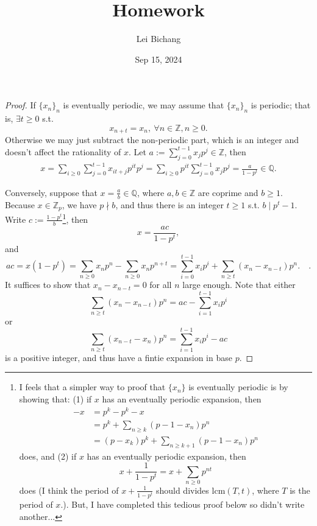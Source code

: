 \documentclass{article}
\title{Homework}
\author{Lei Bichang}
\date{Sep 15, 2024}
\theoremstyle{definition}
\theoremstyle{remark}
\newcommand{\Q}{\mathbb{Q}}
\newcommand{\Z}{\mathbb{Z}}
\begin{document}
\maketitle

\begin{proof}
If $\{x_n\}_n$ is eventually periodic, we may assume that $\{x_n\}_n$ is periodic; that is, $\exists t\ge 0$ s.t. \[x_{n + t} = x_n,\ \forall n\in\Z, n\ge 0.\]
Otherwise we may just subtract the non-periodic part, which is an integer and doesn't affect the rationality of $x$.
Let $a := \sum_{j=0}^{t-1}x_jp^j\in\Z$,
then \begin{align*}
    x = \sum_{i\ge 0}\sum_{j=0}^{t-1} x_{it+j}p^{it}p^j
    = \sum_{i\ge 0}p^{it}\sum_{j=0}^{t-1}x_jp^j 
    = \frac{a}{1-p^t}\in\Q.
\end{align*}

Conversely, suppose that $x = \frac{a}{b}\in\Q$, where $a, b\in\Z$ are coprime and $b\ge 1$.
Because $x\in\Z_p$, we have $p\nmid b$, and thus there is an integer $t\ge 1$ s.t. $b \mid p^t-1$.
Write $c := \frac{1-p^t}{b}$\footnote{I feels that a simpler way to proof that $\{x_n\}$ is eventually periodic is by showing that:
(1) if $x$ has an eventually periodic expansion, then \begin{align*}
            -x &= p^k - p^k -x\\
            &= p^k + \sum_{n\ge k}(p-1 -x_n)p^n\\
            &= (p - x_k)p^k + \sum_{n\ge k + 1}(p - 1 - x_n)p^n
        \end{align*} does,
and (2) if $x$ has an eventually periodic expansion, then
\[x + \frac{1}{1-p^t} = x + \sum_{n\ge 0}p^{nt}\] does (I think the period of $x + \frac{1}{1-p^t}$ should divides $\mathrm{lcm} (T, t)$, where $T$ is the period of $x$.). But, I have completed this tedious proof below so didn't write another...},
then \[x = \frac{ac}{1-p^t},\]
and \[ac = x(1-p^t) = \sum_{n\ge 0}x_np^n - \sum_{n\ge 0}x_{n}p^{n+t} = \sum_{i=0}^{t-1}x_ip^i + \sum_{n\ge t}(x_n-x_{n-t})p^n.\quad.\]
It suffices to show that $x_n - x_{n-t} = 0$ for all $n$ large enough.
Note that either \[\sum_{n\ge t}(x_n-x_{n-t})p^n = ac - \sum_{i=1}^{t-1}x_ip^i\] or \[\sum_{n\ge t}(x_{n-t}-x_{n})p^n = \sum_{i=1}^{t-1}x_ip^i - ac\] is a positive integer, and thus have a fintie expansion in base $p$.



\end{proof}
\end{document}
